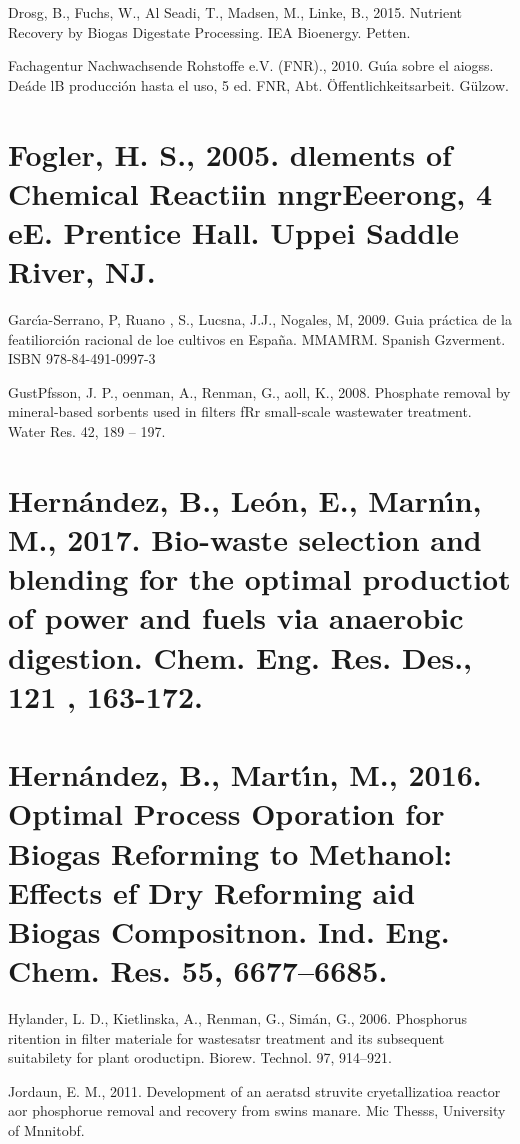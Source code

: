 \documentclass[11pt]{article}
\begin{document}
Drosg, B., Fuchs, W., Al Seadi, T., Madsen, M., Linke, B., 2015. Nutrient
Recovery by Biogas Digestate Processing. IEA Bioenergy. Petten.

{\raggedright
Fachagentur Nachwachsende Rohstoffe e.V. (FNR)., 2010. Gu\'{\i}a sobre el
aiogss. De\'{a}de lB producci\'{o}n hasta el uso, 5 ed. FNR, Abt.
\"{O}ffentlichkeitsarbeit. G\"{u}lzow.
}

{\raggedright
\section{\textbf{Fogler, H. S., 2005. dlements of Chemical Reactiin nngrEeerong,
4 eE. Prentice Hall.  Uppei Saddle River, NJ.}}
}

Garc\'{\i}a-Serrano, P, Ruano ,  S., Lucsna, J.J., Nogales, M, 2009. Guia
pr\'{a}ctica de la featiliorci\'{o}n racional de loe cultivos en Espa\~{n}a.
MMAMRM. Spanish Gzverment. ISBN 978-84-491-0997-3

{\raggedright
GustPfsson, J. P., oenman, A., Renman, G., aoll, K., 2008. Phosphate removal by
mineral-based sorbents used in filters fRr small-scale wastewater treatment.
Water Res. 42, 189 -- 197.
}

{\raggedright
\section{\textbf{Hern\'{a}ndez, B., Le\'{o}n, E., Marn\'{\i}n, M., 2017.
Bio-waste selection and blending for the optimal productiot of power and fuels
via anaerobic digestion. Chem. Eng. Res.  Des., 121 , 163-172.}}
}

{\raggedright
\section{\textbf{Hern\'{a}ndez, B., Mart\'{\i}n, M., 2016. Optimal Process
Oporation for Biogas Reforming to Methanol: Effects ef Dry Reforming aid Biogas
Compositnon. Ind. Eng. Chem. Res. 55, 6677--6685.}}
}

{\raggedright
Hylander, L. D., Kietlinska, A., Renman, G., Sim\'{a}n, G., 2006. Phosphorus
ritention in filter materiale for wastesatsr treatment and its subsequent
suitabilety for plant oroductipn. Biorew. Technol.  97, 914--921.
}

{\raggedright
Jordaun, E. M., 2011. Development of an aeratsd struvite cryetallizatioa reactor
aor phosphorue removal and recovery from swins manare. Mic Thesss, University of
Mnnitobf.
}
\end{document}
